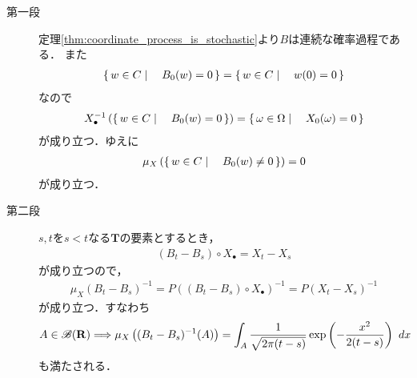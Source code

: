	\begin{sketch}\mbox{}
		\begin{description}
			\item[第一段]
				定理\ref{thm:coordinate_process_is_stochastic}より$B$は連続な確率過程である．
				また
				\begin{align}
					\left\{\, w \in C \mid \quad B_0(w)=0\, \right\} = \left\{\, w \in C \mid \quad w(0) = 0\, \right\}
				\end{align}
				なので
				\begin{align}
					X_\bullet^{-1}\left(\left\{\, w \in C \mid \quad B_0(w)=0\, \right\}\right)
					= \left\{\, \omega \in \Omega \mid \quad X_0(\omega) = 0\, \right\}
				\end{align}
				が成り立つ．ゆえに
				\begin{align}
					\mu_X\left(\left\{\, w \in C \mid \quad B_0(w) \neq 0\, \right\}\right) = 0
				\end{align}
				が成り立つ．
				
			\item[第二段]
				$s,t$を$s < t$なる$\mathbf{T}$の要素とするとき，
				\begin{align}
					(B_t - B_s) \circ X_\bullet = X_t - X_s
				\end{align}
				が成り立つので，
				\begin{align}
					\mu_X (B_t - B_s)^{-1}
					= P \left((B_t - B_s) \circ X_\bullet\right)^{-1}
					= P (X_t - X_s)^{-1}
				\end{align}
				が成り立つ．すなわち
				\begin{align}
					A \in \mathscr{B}(\mathbf{R}) \Longrightarrow
					\mu_X\left((B_t-B_s)^{-1}(A)\right)
					= \int_A \frac{1}{\sqrt{2\pi(t-s)}} \exp\left(-\frac{x^2}{2(t-s)}\right)\ dx
				\end{align}
				も満たされる．
			

\end{description}
\end{sketch}
